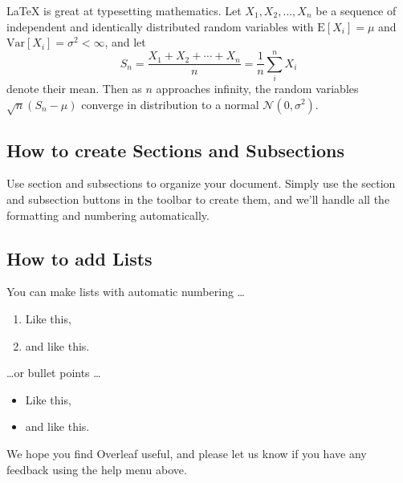 \documentclass[a4paper]{article}
\begin{document}
\LaTeX{} is great at typesetting mathematics. Let $X_1, X_2, \ldots, X_n$ be a sequence of independent and identically distributed random variables with $\text{E}[X_i] = \mu$ and $\text{Var}[X_i] = \sigma^2 < \infty$, and let
\[S_n = \frac{X_1 + X_2 + \cdots + X_n}{n}
      = \frac{1}{n}\sum_{i}^{n} X_i\]
denote their mean. Then as $n$ approaches infinity, the random variables $\sqrt{n}(S_n - \mu)$ converge in distribution to a normal $\mathcal{N}(0, \sigma^2)$.


\subsection{How to create Sections and Subsections}

Use section and subsections to organize your document. Simply use the section and subsection buttons in the toolbar to create them, and we'll handle all the formatting and numbering automatically.

\subsection{How to add Lists}

You can make lists with automatic numbering \dots

\begin{enumerate}
\item Like this,
\item and like this.
\end{enumerate}
\dots or bullet points \dots
\begin{itemize}
\item Like this,
\item and like this.
\end{itemize}

We hope you find Overleaf useful, and please let us know if you have any feedback using the help menu above.
\end{document}
